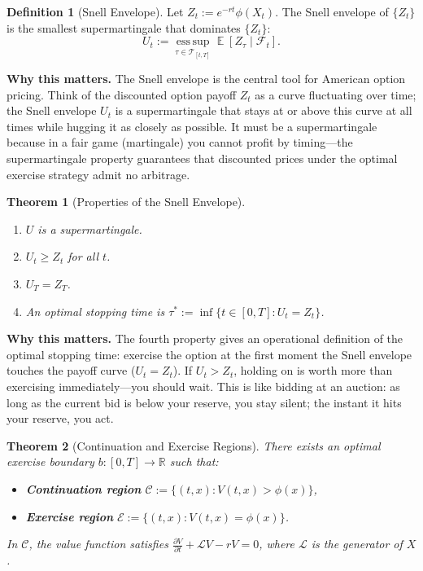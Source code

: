 \documentclass[11pt,a4paper,openany]{book}
\theoremstyle{definition}
\newtheorem{definition}{Definition}[chapter]
\theoremstyle{plain}
\newtheorem{theorem}{Theorem}[chapter]
\theoremstyle{remark}
\DeclareMathOperator{\E}{\mathbb{E}}
\newcommand{\1}{\mathbbm{1}}
\newcommand{\R}{\mathbb{R}}
\newcommand{\F}{\mathcal{F}}
\newcommand{\calL}{\mathcal{L}}
\newcommand{\calE}{\mathcal{E}}
\newcommand{\calC}{\mathcal{C}}
\newcommand{\calT}{\mathcal{T}}
\begin{document}
\begin{definition}[Snell Envelope]
Let $Z_{t} := e^{-rt} \phi(X_{t})$. The Snell envelope of $\{Z_{t}\}$ is the smallest supermartingale that dominates $\{Z_{t}\}$:
\[
U_{t} := \operatorname*{ess\,sup}_{\tau \in \calT_{[t,T]}} \E[Z_{\tau} \mid \F_{t}].
\]
\end{definition}

\medskip
\noindent\textbf{Why this matters.} The Snell envelope is the central tool for American option pricing. Think of the discounted option payoff $Z_t$ as a curve fluctuating over time; the Snell envelope $U_t$ is a supermartingale that stays at or above this curve at all times while hugging it as closely as possible. It must be a supermartingale because in a fair game (martingale) you cannot profit by timing---the supermartingale property guarantees that discounted prices under the optimal exercise strategy admit no arbitrage.

\begin{theorem}[Properties of the Snell Envelope]
\begin{enumerate}[label=(\arabic*)]
    \item $U$ is a supermartingale.
    \item $U_{t} \geq Z_{t}$ for all $t$.
    \item $U_{T} = Z_{T}$.
    \item An optimal stopping time is $\tau^{*} := \inf\{t \in [0,T] : U_{t} = Z_{t}\}$.
\end{enumerate}
\end{theorem}

\medskip
\noindent\textbf{Why this matters.} The fourth property gives an operational definition of the optimal stopping time: exercise the option at the first moment the Snell envelope touches the payoff curve ($U_t = Z_t$). If $U_t > Z_t$, holding on is worth more than exercising immediately---you should wait. This is like bidding at an auction: as long as the current bid is below your reserve, you stay silent; the instant it hits your reserve, you act.

\begin{theorem}[Continuation and Exercise Regions]
There exists an optimal exercise boundary $b: [0,T] \to \R$ such that:
\begin{itemize}
    \item \textbf{Continuation region} $\calC := \{(t,x) : V(t,x) > \phi(x)\}$,
    \item \textbf{Exercise region} $\calE := \{(t,x) : V(t,x) = \phi(x)\}$.
\end{itemize}
In $\calC$, the value function satisfies $\frac{\partial V}{\partial t} + \calL V - rV = 0$, where $\calL$ is the generator of $X$.
\end{theorem}
\end{document}

